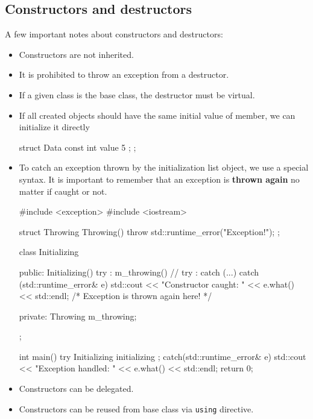 \documentclass[../main]{subfiles}
\begin{document}
\subsection{Constructors and destructors}
    A few important notes about constructors and destructors:
\begin{itemize}
    \item Constructors are not inherited.
    \item It is prohibited to throw an exception from a destructor.
    \item If a given class is the base class, the destructor must be virtual.
    \item If all created objects should have the same initial value of member, we can initialize it directly
    \begin{Code}
        struct Data
        {
            const int value { 5 }; 
        };
    \end{Code}
    \item To catch an exception thrown by the initialization list object, we use a special syntax. It is important to remember that an exception is \textbf{thrown again} no matter if caught or not.
    \
    \begin{Code}
        #include <exception>
        #include <iostream>
        
        struct Throwing
        {
            Throwing()
            {
               throw std::runtime_error("Exception!");
            }
        };
        
        class Initializing
        {
        public:
            Initializing()
               try : m_throwing() // try : catch (...) {}
               {
               }
               catch (std::runtime_error& e)
               {
                  std::cout << "Constructor caught: " << e.what() << std::endl;
                  /* Exception is thrown again here! */
               }
           
        private:
            Throwing m_throwing;
        };
        
        int main()
        {
            try
            {
                Initializing initializing {};
            }
            catch(std::runtime_error& e)
            {
                std::cout << "Exception handled: " << e.what() << std::endl;
            }
            return 0;
        }
    \end{Code}
    \item Constructors can be delegated.
    \item Constructors can be reused from base class via \texttt{using} directive.
\end{itemize}
\end{document}
